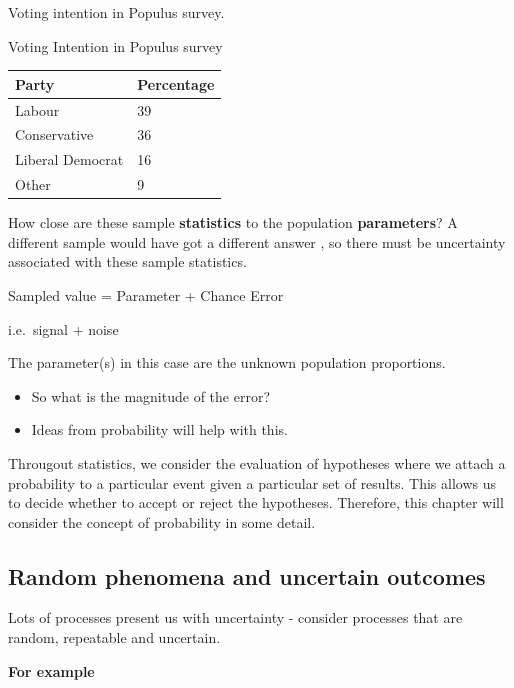 \documentclass[
  oneside]{krantz}
\providecommand{\tightlist}{%
  \setlength{\itemsep}{0pt}\setlength{\parskip}{0pt}}
\begin{document}
\label{tab:Votint} Voting intention in Populus survey.

\begin{table}
\label{Votint}
\caption{Voting Intention in Populus survey}
\end{table}

\begin{longtable}[]{@{}ll@{}}
\toprule
Party & Percentage\tabularnewline
\midrule
\endhead
Labour & 39\tabularnewline
Conservative & 36\tabularnewline
Liberal Democrat & 16\tabularnewline
Other & 9\tabularnewline
\bottomrule
\end{longtable}

How close are these sample \textbf{statistics} to the population \textbf{parameters}? A different sample would have got a different answer , so there must be uncertainty associated with these sample statistics.

Sampled value = Parameter + Chance Error

i.e.~signal + noise

The parameter(s) in this case are the unknown population proportions.

\begin{itemize}
\tightlist
\item
  So what is the magnitude of the error?
\item
  Ideas from probability will help with this.
\end{itemize}

Througout statistics, we consider the evaluation of hypotheses where we attach a probability to a particular event given a particular set of results. This allows us to decide whether to accept or reject the hypotheses. Therefore, this chapter will consider the concept of probability in some detail.

\hypertarget{random-phenomena-and-uncertain-outcomes}{%
\subsection{Random phenomena and uncertain outcomes}\label{random-phenomena-and-uncertain-outcomes}}

Lots of processes present us with uncertainty - consider processes that are random, repeatable and uncertain.

\textbf{For example}
\end{document}
